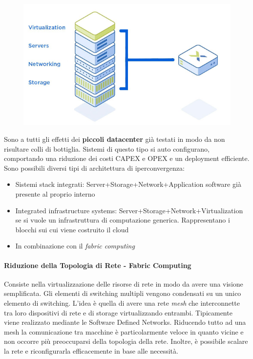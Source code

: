 \documentclass{article}
\begin{document}
		\begin{figure}[ht]
			\centering
			\includegraphics[width=0.3\linewidth]{SAC_B7_hyperconvergence}
			\label{fig:sacb7hyperconvergence}
		\end{figure}
		
		Sono a tutti gli effetti dei \textbf{piccoli datacenter} già testati in modo da non risultare colli di bottiglia. Sistemi di questo tipo si auto configurano, comportando una riduzione dei costi CAPEX e OPEX e un deployment efficiente.\\
		Sono possibili diversi tipi di architettura di iperconvergenza:
		\begin{itemize}
			\item Sistemi stack integrati: Server+Storage+Network+Application software già presente al proprio interno
			\item Integrated infrastructure systems: Server+Storage+Network+Virtualization se si vuole un infrastruttura di computazione generica. Rappresentano i blocchi sui cui viene costruito il cloud
			\item In combinazione con il \textit{fabric computing}
		\end{itemize}
		
		
		\paragraph{Riduzione della Topologia di Rete - Fabric Computing}\label{riduzione-della-topologia-di-rete}
		Consiste nella virtualizzazione delle risorse di rete in modo
		da avere una visione semplificata. Gli elementi di
		switching multipli vengono condensati su un unico
		elemento di switching. L'idea è quella di avere una rete \textit{mesh} che interconnette tra loro dispositivi di rete e
		di storage virtualizzando entrambi. Tipicamente viene realizzato mediante le Software Defined Networks. Riducendo tutto ad una mesh la comunicazione tra macchine è particolarmente veloce in quanto vicine e non occorre più preoccuparsi della topologia della rete. Inoltre, è possibile scalare la rete e riconfigurarla efficacemente in base alle necessità.
\end{document}
